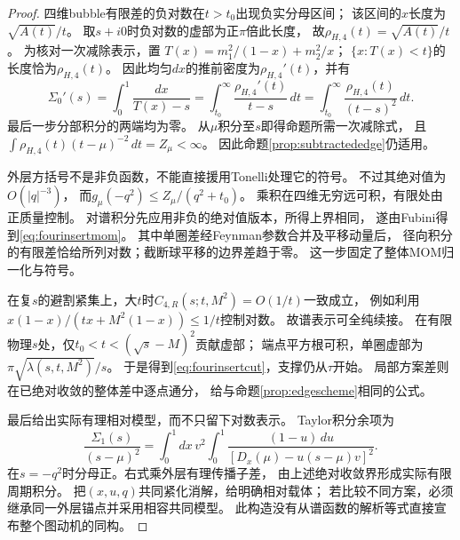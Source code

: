 \documentclass[11pt,a4paper]{ctexart}
\theoremstyle{cnplain}\newtheorem{theorem}{定理}[section]
\theoremstyle{definition}\newtheorem{definition}[theorem]{定义}
\theoremstyle{remark}\newtheorem{remark}[theorem]{注}
\begin{document}
\begin{proof}
四维bubble有限差的负对数在$t>t_0$出现负实分母区间；
该区间的$x$长度为$\sqrt{A(t)}/t$。
取$s+i0$时负对数的虚部为正$\pi$倍此长度，
故$\rho_{H,4}(t)=\sqrt{A(t)}/t$。
为核对一次减除表示，置
$T(x)=m_1^2/(1-x)+m_2^2/x$；
$\{x:T(x)<t\}$的长度恰为$\rho_{H,4}(t)$。
因此均匀$dx$的推前密度为$\rho_{H,4}'(t)$，并有
\[
 \Sigma_0'(s)=\int_0^1\frac{dx}{T(x)-s}
 =\int_{t_0}^\infty\frac{\rho_{H,4}'(t)}{t-s}\,dt
 =\int_{t_0}^\infty\frac{\rho_{H,4}(t)}{(t-s)^2}\,dt.
\]
最后一步分部积分的两端均为零。
从$\mu$积分至$s$即得命题所需一次减除式，
且$\int\rho_{H,4}(t)(t-\mu)^{-2}\,dt=Z_\mu<\infty$。
因此命题\ref{prop:subtractededge}仍适用。

外层方括号不是非负函数，不能直接援用Tonelli处理它的符号。
不过其绝对值为$O(|q|^{-3})$，
而$g_\mu(-q^2)\leq Z_\mu/(q^2+t_0)$。
乘积在四维无穷远可积，有限处由正质量控制。
对谱积分先应用非负的绝对值版本，所得上界相同，
遂由Fubini得到\eqref{eq:fourinsertmom}。
其中单圈差经Feynman参数合并及平移动量后，
径向积分的有限差恰给所列对数；截断球平移的边界差趋于零。
这一步固定了整体MOM归一化与符号。

在复$s$的避割紧集上，大$t$时$C_{4,R}(s;t,M^2)=O(1/t)$一致成立，
例如利用$x(1-x)/(tx+M^2(1-x))\leq1/t$控制对数。
故谱表示可全纯续接。
在有限物理$s$处，仅$t_0<t<(\sqrt s-M)^2$贡献虚部；
端点平方根可积，单圈虚部为$\pi\sqrt{\lambda(s,t,M^2)}/s$。
于是得到\eqref{eq:fourinsertcut}，支撑仍从$\tau$开始。
局部方案差则在已绝对收敛的整体差中逐点通分，
给与命题\ref{prop:edgescheme}相同的公式。

最后给出实际有理相对模型，而不只留下对数表示。
Taylor积分余项为
\begin{equation}\label{eq:logrationalremainder}
 \frac{\Sigma_1(s)}{(s-\mu)^2}
 =\int_0^1dx\,v^2
       \int_0^1\frac{(1-u)\,du}
              {[D_x(\mu)-u(s-\mu)v]^2}.
\end{equation}
在$s=-q^2$时分母正。右式乘外层有理传播子差，
由上述绝对收敛界形成实际有限周期积分。
把$(x,u,q)$共同紧化消解，给明确相对载体；
若比较不同方案，必须继承同一外层锚点并采用相容共同模型。
此构造没有从谱函数的解析等式直接宣布整个图动机的同构。
\end{proof}
\end{document}
